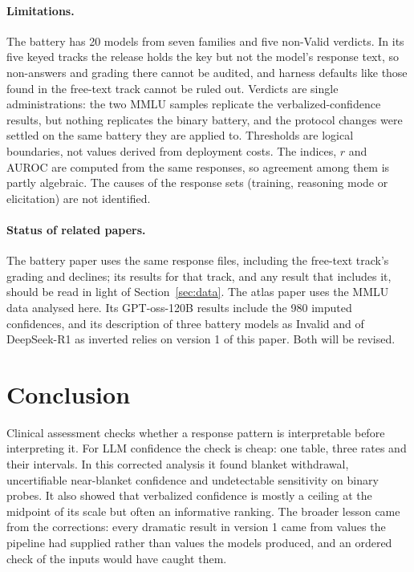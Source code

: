 \documentclass[11pt,a4paper]{article}
\begin{document}
\paragraph{Limitations.} The battery has 20 models from seven families and five non-Valid verdicts. In its five keyed tracks the release holds the key but not the model's response text, so non-answers and grading there cannot be audited, and harness defaults like those found in the free-text track cannot be ruled out. Verdicts are single administrations: the two MMLU samples replicate the verbalized-confidence results, but nothing replicates the binary battery, and the protocol changes were settled on the same battery they are applied to. Thresholds are logical boundaries, not values derived from deployment costs. The indices, $r$ and AUROC are computed from the same responses, so agreement among them is partly algebraic. The causes of the response sets (training, reasoning mode or elicitation) are not identified.

\paragraph{Status of related papers.}\label{sec:upstream} The battery paper \citep{cacioli2026c} uses the same response files, including the free-text track's grading and declines; its results for that track, and any result that includes it, should be read in light of Section~\ref{sec:data}. The atlas paper \citep{cacioli2026atlas} uses the MMLU data analysed here. Its GPT-oss-120B results include the 980 imputed confidences, and its description of three battery models as Invalid and of DeepSeek-R1 as inverted relies on version 1 of this paper. Both will be revised.

\section{Conclusion}

Clinical assessment checks whether a response pattern is interpretable before interpreting it. For LLM confidence the check is cheap: one table, three rates and their intervals. In this corrected analysis it found blanket withdrawal, uncertifiable near-blanket confidence and undetectable sensitivity on binary probes. It also showed that verbalized confidence is mostly a ceiling at the midpoint of its scale but often an informative ranking. The broader lesson came from the corrections: every dramatic result in version 1 came from values the pipeline had supplied rather than values the models produced, and an ordered check of the inputs would have caught them.
\end{document}
